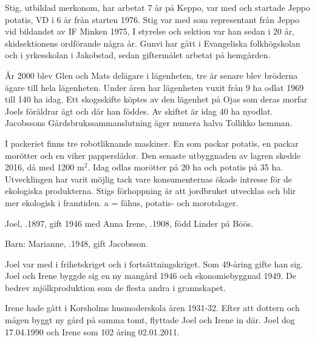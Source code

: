 Stig, utbildad merkonom, har arbetat 7 år på Keppo, var med och startade Jeppo potatis, VD i 6 år från starten 1976. Stig var med som representant från Jeppo vid bildandet av IF Minken 1975, I styrelse och sektion var han sedan i 20 år, skidsektionens ordförande några år. Gunvi har gått i Evangeliska folkhögskolan och i yrkesskolan i Jakobstad, sedan giftermålet arbetat på hemgården.

År 2000 blev Glen och Mats delägare i lägenheten, tre år senare blev bröderna ägare till hela lägenheten. Under åren har lägenheten vuxit från 9 ha odlat 1969 till 140 ha idag. Ett skogsskifte köptes av den lägenhet på Ojas som deras morfar Joels föräldrar ägt och där han föddes. Av skiftet är idag 40 ha nyodlat. Jacobssons Gårdsbrukssammanslutning äger numera halva Tollikko hemman.

I packeriet finns tre robotliknande maskiner. En som packar potatis, en packar morötter och en viker papperslådor. Den senaste utbyggnaden av lagren skedde 2016, då med 1200 m$^2$. Idag odlas morötter på 20 ha och potatis på 35 ha. Utvecklingen har varit möjlig tack vare konsumenternas ökade intresse för de ekologiska produkterna. Stigs förhoppning är att jordbruket utvecklas och blir mer ekologisk i framtiden. a = fähus, potatis- och morotslager.


%



%
Joel, .1897, gift 1946 med Anna Irene, .1908, född Linder på Böös.

Barn:  Marianne, .1948, gift Jacobsson.

Joel var med i frihetskriget och i fortsättningskriget. Som 49-åring gifte han sig. Joel och Irene byggde sig en ny mangård 1946 och ekonomiebyggnad 1949. De bedrev mjölkproduktion som de flesta andra i grannskapet.

Irene hade gått i Korsholms husmoderskola åren 1931-32. Efter att dottern och mågen byggt ny gård på samma tomt, flyttade Joel och Irene in där. Joel dog 17.04.1990 och Irene som 102 åring 02.01.2011.



%


